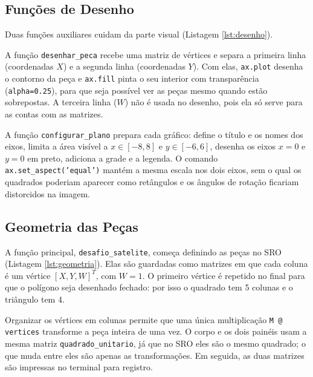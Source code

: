\documentclass{article}
\begin{document}
\subsection{Funções de Desenho}

Duas funções auxiliares cuidam da parte visual (Listagem \ref{lst:desenho}).

A função \texttt{desenhar\_peca} recebe uma matriz de vértices e separa a primeira linha (coordenadas $X$) e a segunda linha (coordenadas $Y$). Com elas, \texttt{ax.plot} desenha o contorno da peça e \texttt{ax.fill} pinta o seu interior com transparência (\texttt{alpha=0.25}), para que seja possível ver as peças mesmo quando estão sobrepostas. A terceira linha ($W$) não é usada no desenho, pois ela só serve para as contas com as matrizes.

A função \texttt{configurar\_plano} prepara cada gráfico: define o título e os nomes dos eixos, limita a área visível a $x \in [-8, 8]$ e $y \in [-6, 6]$, desenha os eixos $x = 0$ e $y = 0$ em preto, adiciona a grade e a legenda. O comando \texttt{ax.set\_aspect('equal')} mantém a mesma escala nos dois eixos, sem o qual os quadrados poderiam aparecer como retângulos e os ângulos de rotação ficariam distorcidos na imagem.



\subsection{Geometria das Peças}

A função principal, \texttt{desafio\_satelite}, começa definindo as peças no SRO (Listagem \ref{lst:geometria}). Elas são guardadas como matrizes em que cada coluna é um vértice $[X, Y, W]^T$, com $W = 1$. O primeiro vértice é repetido no final para que o polígono seja desenhado fechado: por isso o quadrado tem 5 colunas e o triângulo tem 4.

Organizar os vértices em colunas permite que uma única multiplicação \texttt{M @ vertices} transforme a peça inteira de uma vez. O corpo e os dois painéis usam a mesma matriz \texttt{quadrado\_unitario}, já que no SRO eles são o mesmo quadrado; o que muda entre eles são apenas as transformações. Em seguida, as duas matrizes são impressas no terminal para registro.


\end{document}
